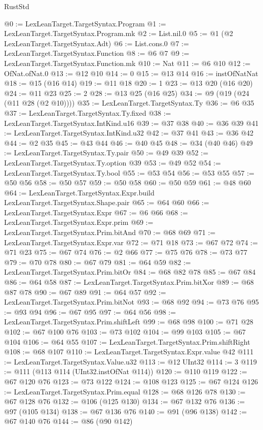 \begin{lexlean}{RustStd}
\begin{coremodule}
@0 := LexLeanTarget.TargetSyntax.Program
@1 := LexLeanTarget.TargetSyntax.Program.mk
@2 := List.nil.{0}
@5 := @1 (@2 LexLeanTarget.TargetSyntax.Adt)
@6 := List.cons.{0}
@7 := LexLeanTarget.TargetSyntax.Function
@8 := @6 @7
@9 := LexLeanTarget.TargetSyntax.Function.mk
@10 := Nat
@11 := @6 @10
@12 := OfNat.ofNat.{0}
@13 := @12 @10
@14 := 0
@15 := @13 @14
@16 := instOfNatNat
@18 := @15 (@16 @14)
@19 := @11 @18
@20 := 1
@23 := @13 @20 (@16 @20)
@24 := @11 @23
@25 := 2
@28 := @13 @25 (@16 @25)
@34 := @9 (@19 (@24 (@11 @28 (@2 @10))))
@35 := LexLeanTarget.TargetSyntax.Ty
@36 := @6 @35
@37 := LexLeanTarget.TargetSyntax.Ty.fixed
@38 := LexLeanTarget.TargetSyntax.IntKind.u16
@39 := @37 @38
@40 := @36 @39
@41 := LexLeanTarget.TargetSyntax.IntKind.u32
@42 := @37 @41
@43 := @36 @42
@44 := @2 @35
@45 := @43 @44
@46 := @40 @45
@48 := @34 (@40 @46)
@49 := LexLeanTarget.TargetSyntax.Ty.pair
@50 := @49 @39
@52 := LexLeanTarget.TargetSyntax.Ty.option @39
@53 := @49 @52
@54 := LexLeanTarget.TargetSyntax.Ty.bool
@55 := @53 @54
@56 := @53 @55
@57 := @50 @56
@58 := @50 @57
@59 := @50 @58
@60 := @50 @59
@61 := @48 @60
@64 := LexLeanTarget.TargetSyntax.Expr.build LexLeanTarget.TargetSyntax.Shape.pair
@65 := @64 @60
@66 := LexLeanTarget.TargetSyntax.Expr
@67 := @6 @66
@68 := LexLeanTarget.TargetSyntax.Expr.prim
@69 := LexLeanTarget.TargetSyntax.Prim.bitAnd
@70 := @68 @69
@71 := LexLeanTarget.TargetSyntax.Expr.var
@72 := @71 @18
@73 := @67 @72
@74 := @71 @23
@75 := @67 @74
@76 := @2 @66
@77 := @75 @76
@78 := @73 @77
@79 := @70 @78
@80 := @67 @79
@81 := @64 @59
@82 := LexLeanTarget.TargetSyntax.Prim.bitOr
@84 := @68 @82 @78
@85 := @67 @84
@86 := @64 @58
@87 := LexLeanTarget.TargetSyntax.Prim.bitXor
@89 := @68 @87 @78
@90 := @67 @89
@91 := @64 @57
@92 := LexLeanTarget.TargetSyntax.Prim.bitNot
@93 := @68 @92
@94 := @73 @76
@95 := @93 @94
@96 := @67 @95
@97 := @64 @56
@98 := LexLeanTarget.TargetSyntax.Prim.shiftLeft
@99 := @68 @98
@100 := @71 @28
@102 := @67 @100 @76
@103 := @73 @102
@104 := @99 @103
@105 := @67 @104
@106 := @64 @55
@107 := LexLeanTarget.TargetSyntax.Prim.shiftRight
@108 := @68 @107
@110 := LexLeanTarget.TargetSyntax.Expr.value @42
@111 := LexLeanTarget.TargetSyntax.Value.u32
@113 := @12 UInt32
@114 := 3
@119 := @111 (@113 @114 (UInt32.instOfNat @114))
@120 := @110 @119
@122 := @67 @120 @76
@123 := @73 @122
@124 := @108 @123
@125 := @67 @124
@126 := LexLeanTarget.TargetSyntax.Prim.equal
@128 := @68 @126 @78
@130 := @67 @128 @76
@132 := @106 (@125 @130)
@134 := @67 @132 @76
@136 := @97 (@105 @134)
@138 := @67 @136 @76
@140 := @91 (@96 @138)
@142 := @67 @140 @76
@144 := @86 (@90 @142)

\end{coremodule}
\end{lexlean}
